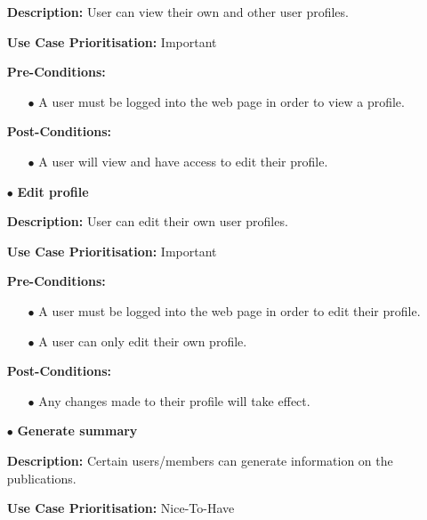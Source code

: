 \documentclass[a4paper,12pt]{article}
\begin{document}
\begin{itemize}
	\textbf{Description:} User can view their own and other user profiles.\newline
	
	\textbf{Use Case Prioritisation:} Important\newline

	\textbf{Pre-Conditions:}
	\begin{itemize}
		\item[$\bullet$]A user must be logged into the web page in order to view a profile.
		\\
	\end{itemize}
	\textbf{Post-Conditions: }
	\begin{itemize}
		\item[$\bullet$]A user will view and have access to edit their profile.
		\\
	\end{itemize}
	\item[$\bullet$]\textbf{Edit profile}\newline

	\textbf{Description:} User can edit their own user profiles.\newline
	
	\textbf{Use Case Prioritisation:} Important\newline	

	\textbf{Pre-Conditions:}
	\begin{itemize}
		\item[$\bullet$]A user must be logged into the web page in order to edit their profile.
		\item[$\bullet$]A user can only edit their own profile.
		\\
	\end{itemize}
	\textbf{Post-Conditions: }
	\begin{itemize}
		\item[$\bullet$]Any changes made to their profile will take effect.
		\\
	\end{itemize}

	\newpage
	\item[$\bullet$]\textbf{Generate summary}\newline

	\textbf{Description:} Certain users/members can generate information on the publications.\newline
	
	\textbf{Use Case Prioritisation:} Nice-To-Have\newline


\end{itemize}
\end{document}
